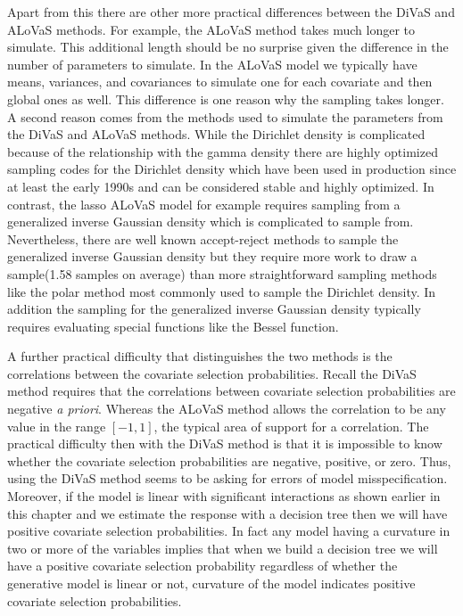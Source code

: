 Apart from this there are other more practical differences between the DiVaS and ALoVaS methods. For example, the ALoVaS method takes much longer to simulate. This additional length should be no surprise given the difference in the number of parameters to simulate. In the ALoVaS model we typically have means, variances, and covariances to simulate one for each covariate and then global ones as well. This difference is one reason why the sampling takes longer. A second reason comes from the methods used to simulate the parameters from the DiVaS and ALoVaS methods. While the Dirichlet density is complicated because of the relationship with the gamma density there are highly optimized sampling codes for the Dirichlet density which have been used in production since at least the early 1990s and can be considered stable and highly optimized. In contrast, the lasso ALoVaS model for example requires sampling from a generalized inverse Gaussian density which is complicated to sample from. Nevertheless, there are well known accept-reject methods to sample the generalized inverse Gaussian density but they require more work to draw a sample(1.58 samples on average)  than more straightforward sampling methods like the polar method most commonly used to sample the Dirichlet density. In addition the sampling for the generalized inverse Gaussian density typically requires evaluating special functions like the Bessel function. 

A further practical difficulty that distinguishes the two methods is the correlations between the covariate selection probabilities. Recall the DiVaS method requires that the correlations between covariate selection probabilities are negative \emph{a priori}. Whereas the ALoVaS method allows the correlation to be any value in the range $[-1,1]$, the typical area of support for a correlation. The practical difficulty then with the DiVaS method is that it is impossible to know whether the covariate selection probabilities are negative, positive, or zero. Thus, using the DiVaS method seems to be asking for errors of model misspecification. Moreover, if the model is linear with significant interactions as shown earlier in this chapter and we estimate the response with a decision tree then we will have positive covariate selection probabilities. 
In fact any model having a curvature in two or more of the variables implies that when we build a decision tree we will have a positive covariate selection probability regardless of whether the generative model is linear or not, curvature of the model indicates positive covariate selection probabilities. 

